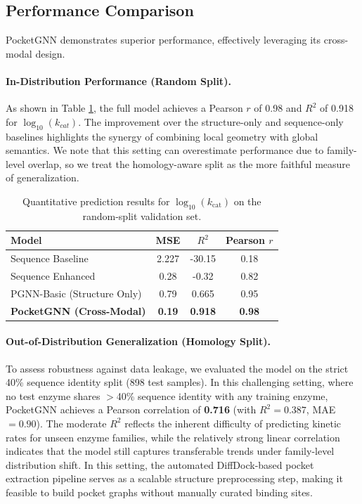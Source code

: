 \documentclass[11pt]{article}
\begin{document}
\subsection{Performance Comparison}

PocketGNN demonstrates superior performance, effectively leveraging its cross-modal design.

\paragraph{In-Distribution Performance (Random Split).}
As shown in Table \ref{tab:results}, the full model achieves a Pearson $r$ of 0.98 and $R^2$ of 0.918 for $\log_{10}(k_{cat})$. The improvement over the structure-only and sequence-only baselines highlights the synergy of combining local geometry with global semantics. We note that this setting can overestimate performance due to family-level overlap, so we treat the homology-aware split as the more faithful measure of generalization.

\begin{table}[h]
\centering
\caption{Quantitative prediction results for $\log_{10}(k_{\text{cat}})$ on the random-split validation set.}
\label{tab:results}
\begin{tabular}{lccc}
\toprule
Model & MSE & $R^2$ & Pearson $r$ \\
\midrule
Sequence Baseline & 2.227 & -30.15 & 0.18 \\
Sequence Enhanced & 0.28 & -0.32 & 0.82 \\
PGNN-Basic (Structure Only) & 0.79 & 0.665 & 0.95 \\
\textbf{PocketGNN (Cross-Modal)} & \textbf{0.19} & \textbf{0.918} & \textbf{0.98} \\
\bottomrule
\end{tabular}
\end{table}

\paragraph{Out-of-Distribution Generalization (Homology Split).}
To assess robustness against data leakage, we evaluated the model on the strict 40\% sequence identity split (898 test samples). In this challenging setting, where no test enzyme shares $>$40\% sequence identity with any training enzyme, PocketGNN achieves a Pearson correlation of \textbf{0.716} (with $R^2=0.387$, MAE$=0.90$). The moderate $R^2$ reflects the inherent difficulty of predicting kinetic rates for unseen enzyme families, while the relatively strong linear correlation indicates that the model still captures transferable trends under family-level distribution shift. In this setting, the automated DiffDock-based pocket extraction pipeline serves as a scalable structure preprocessing step, making it feasible to build pocket graphs without manually curated binding sites.
\end{document}
